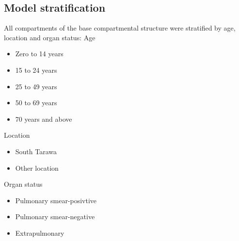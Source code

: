 \subsection{Model stratification}
All compartments of the base compartmental structure were stratified by age, location and organ status:\linebreak
Age
\begin{itemize}
    \item Zero to 14 years
    \item 15 to 24 years
    \item 25 to 49 years
    \item 50 to 69 years
    \item 70 years and above
\end{itemize}
Location
\begin{itemize}
    \item South Tarawa
    \item Other location
\end{itemize}
Organ status
\begin{itemize}
    \item Pulmonary smear-posivtive
    \item Pulmonary smear-negative
    \item Extrapulmonary
\end{itemize}
